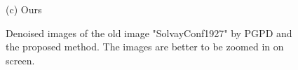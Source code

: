 \documentclass[runningheads]{llncs}
\begin{document}
\begin{figure}
{\begin{minipage}[t]{0.33\textwidth}
\centering
{}
{\footnotesize (c) Ours }
\end{minipage}
}
\caption{Denoised images of the old image "SolvayConf1927" by PGPD and the proposed method. The images are better to be zoomed in on screen.}
\label{fig36}
\end{figure}
\end{document}
